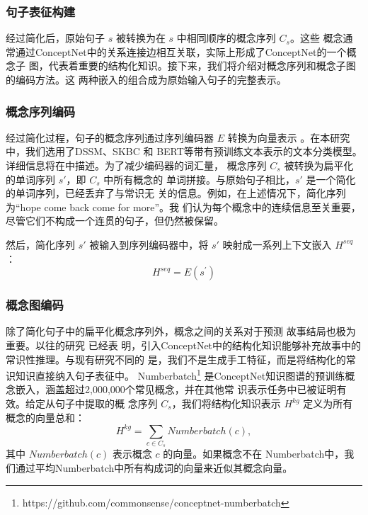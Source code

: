     \subsubsection{句子表征构建}
    \label{sec2:represent}

    经过简化后，原始句子 $s$ 被转换为在 $s$ 中相同顺序的概念序列 $C_s$。这些
    概念通常通过ConceptNet中的关系连接边相互关联，实际上形成了ConceptNet的一个概念子
    图，代表着重要的结构化知识。接下来，我们将介绍对概念序列和概念子图的编码方法。这
    两种嵌入的组合成为原始输入句子的完整表示。

\subsubsection*{概念序列编码}
经过简化过程，句子的概念序列通过序列编码器 $E$ 转换为向量表示
。在本研究中，我们选用了DSSM\cite{huang2013learning}、SKBC\cite{roemmele2017rnn} 和 
BERT\cite{devlin2018bert}等带有预训练文本表示的文本分类模型。
详细信息将在中描述。为了减少编码器的词汇量，
概念序列 $C_s$ 被转换为扁平化的单词序列 $s'$，即 $C_s$ 中所有概念的
单词拼接。与原始句子相比，$s'$ 是一个简化的单词序列，已经丢弃了与常识无
关的信息。例如，在上述情况下，简化序列为``hope come back come for more''。我
们认为每个概念中的连续信息至关重要，尽管它们不构成一个连贯的句子，但仍然被保留。

然后，简化序列 $s'$ 被输入到序列编码器中，将 $s'$ 映射成一系列上下文嵌入 $H^{seq}$：
\begin{equation}
H^{seq} = E\left(s^{'}\right)
\end{equation}

\subsubsection*{概念图编码}
除了简化句子中的扁平化概念序列外，概念之间的关系对于预测
故事结局也极为重要。以往的研究\cite{chen2018incorporating,guan2018story} 已经表
明，引入ConceptNet中的结构化知识能够补充故事中的常识性推理。与现有研究不同的
是，我们不是生成手工特征，而是将结构化的常识知识直接纳入句子表征中。
Numberbatch\footnote{https://github.com/commonsense/conceptnet-numberbatch}
是ConceptNet知识图谱的预训练概念嵌入，涵盖超过2,000,000个常见概念，并在其他常
识表示任务中已被证明有效\cite{speer2017conceptnet2}。给定从句子中提取的概
念序列 $C_s$，我们将结构化知识表示 $H^{kg}$ 定义为所有概念的向量总和：
\begin{equation}
H^{kg} = \sum_{c \in C_s}{Numberbatch(c)},
\end{equation}
其中 $Numberbatch(c)$ 表示概念 $c$ 的向量。如果概念不在
Numberbatch中，我们通过平均Numberbatch中所有构成词的向量来近似其概念向量。

